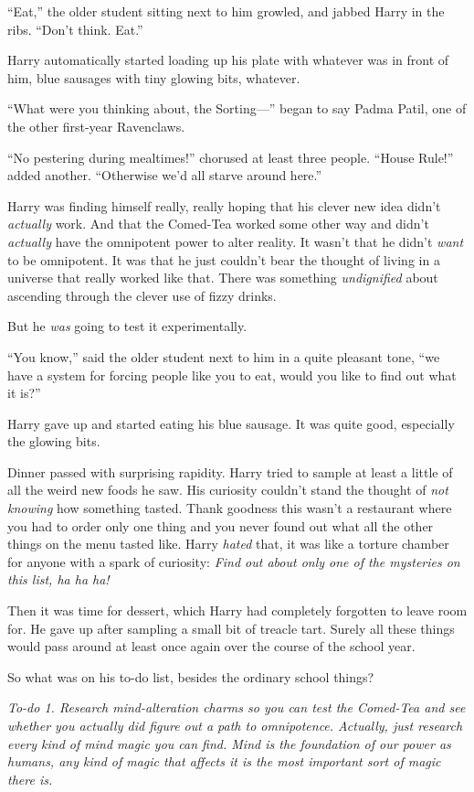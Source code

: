``Eat,'' the older student sitting next to him growled, and jabbed Harry
in the ribs. ``Don't think. Eat.''

Harry automatically started loading up his plate with whatever was in
front of him, blue sausages with tiny glowing bits, whatever.

``What were you thinking about, the Sorting---'' began to say Padma
Patil, one of the other first-year Ravenclaws.

``No pestering during mealtimes!'' chorused at least three people.
``House Rule!'' added another. ``Otherwise we'd all starve around
here.''

Harry was finding himself really, really hoping that his clever new idea
didn't \emph{actually} work. And that the Comed-Tea worked some other
way and didn't \emph{actually} have the omnipotent power to alter
reality. It wasn't that he didn't \emph{want} to be omnipotent. It was
that he just couldn't bear the thought of living in a universe that
really worked like that. There was something \emph{undignified} about
ascending through the clever use of fizzy drinks.

But he \emph{was} going to test it experimentally.

``You know,'' said the older student next to him in a quite pleasant
tone, ``we have a system for forcing people like you to eat, would you
like to find out what it is?''

Harry gave up and started eating his blue sausage. It was quite good,
especially the glowing bits.

Dinner passed with surprising rapidity. Harry tried to sample at least a
little of all the weird new foods he saw. His curiosity couldn't stand
the thought of \emph{not knowing} how something tasted. Thank goodness
this wasn't a restaurant where you had to order only one thing and you
never found out what all the other things on the menu tasted like. Harry
\emph{hated} that, it was like a torture chamber for anyone with a spark
of curiosity: \emph{Find out about only one of the mysteries on this
list, ha ha ha!}

Then it was time for dessert, which Harry had completely forgotten to
leave room for. He gave up after sampling a small bit of treacle tart.
Surely all these things would pass around at least once again over the
course of the school year.

So what was on his to-do list, besides the ordinary school things?

\emph{To-do 1. Research mind-alteration charms so you can test the
Comed-Tea and see whether you actually did figure out a path to
omnipotence. Actually, just research every kind of mind magic you can
find. Mind is the foundation of our power as humans, any kind of magic
that affects it is the most important sort of magic there is.}

